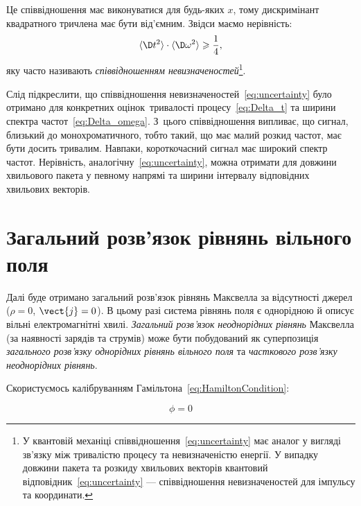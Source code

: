 Це співвідношення має виконуватися для будь-яких $x$, тому дискримінант квадратного тричлена має бути від'ємним. Звідси
маємо нерівність:
\begin{equation}\label{eq:uncertainty}
	\langle \D t^2 \rangle \cdot \langle \D \omega^2 \rangle\geqslant \frac14,
\end{equation}
яку часто називають \emph{співвідношенням невизначеностей}\footnote{У квантовій
	механіці співвідношення~\eqref{eq:uncertainty} має аналог у вигляді зв'язку між тривалістю процесу та невизначеністю
	енергії. У випадку довжини пакета та розкиду хвильових векторів квантовий відповідник~\eqref{eq:uncertainty} ---
	співвідношення невизначеностей для імпульсу та координати.}.

Слід підкреслити, що співвідношення невизначеностей~\eqref{eq:uncertainty} було отримано для конкретних
оцінок~тривалості процесу~\eqref{eq:Delta_t} та ширини спектра частот~\eqref{eq:Delta_omega}. З~цього співвідношення
випливає, що сигнал, близький до монохроматичного, тобто такий, що має малий розкид частот, має бути досить тривалим.
Навпаки, короткочасний сигнал має широкий спектр частот. Нерівність, аналогічну~\eqref{eq:uncertainty}, можна отримати
для довжини хвильового пакета у певному напрямі та ширини інтервалу відповідних хвильових векторів.

\section{Загальний розв'язок рівнянь вільного поля}

Далі буде отримано загальний розв'язок рівнянь Максвелла за відсутності джерел (\(\rho = 0\), \(\vect{j} = 0\)). В цьому
разі система рівнянь поля є однорідною й описує вільні електромагнітні хвилі. \textit{Загальний розв'язок}
\textit{неоднорідних рівнянь} Максвелла (за наявності зарядів та струмів) може бути побудований як суперпозиція
\textit{загального розв'язку однорідних рівнянь вільного поля} та \textit{часткового розв'язку неоднорідних рівнянь}.

Скористуємось калібруванням Гамільтона~\eqref{eq:HamiltonCondition}:

\begin{equation}
	\phi = 0
	\label{eq:phi_zero}
\end{equation}

